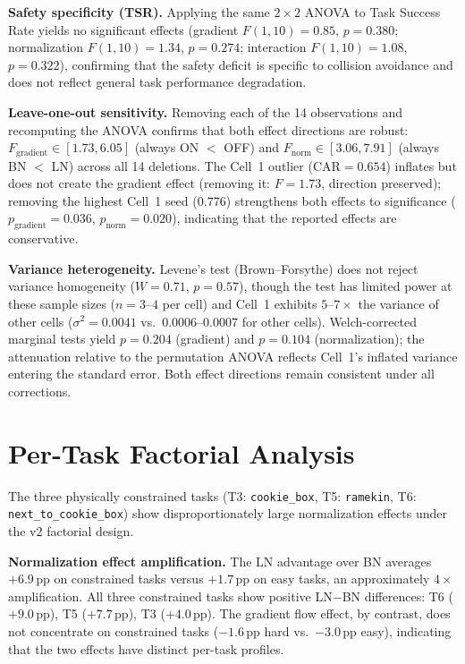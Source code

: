\textbf{Safety specificity (TSR).} Applying the same $2{\times}2$ ANOVA to Task Success Rate yields no significant effects (gradient $F(1,10){=}0.85$, $p{=}0.380$; normalization $F(1,10){=}1.34$, $p{=}0.274$; interaction $F(1,10){=}1.08$, $p{=}0.322$), confirming that the safety deficit is specific to collision avoidance and does not reflect general task performance degradation.

\textbf{Leave-one-out sensitivity.} Removing each of the 14 observations and recomputing the ANOVA confirms that both effect directions are robust: $F_\text{gradient} \in [1.73, 6.05]$ (always ON ${<}$ OFF) and $F_\text{norm} \in [3.06, 7.91]$ (always BN ${<}$ LN) across all 14 deletions. The Cell~1 outlier ($\text{CAR}{=}0.654$) inflates but does not create the gradient effect (removing it: $F{=}1.73$, direction preserved); removing the highest Cell~1 seed ($0.776$) strengthens both effects to significance ($p_\text{gradient}{=}0.036$, $p_\text{norm}{=}0.020$), indicating that the reported effects are conservative.

\textbf{Variance heterogeneity.} Levene's test (Brown--Forsythe) does not reject variance homogeneity ($W{=}0.71$, $p{=}0.57$), though the test has limited power at these sample sizes ($n{=}3$--$4$ per cell) and Cell~1 exhibits $5$--$7{\times}$ the variance of other cells ($\sigma^2{=}0.0041$ vs.\ $0.0006$--$0.0007$ for other cells). Welch-corrected marginal tests yield $p{=}0.204$ (gradient) and $p{=}0.104$ (normalization); the attenuation relative to the permutation ANOVA reflects Cell~1's inflated variance entering the standard error. Both effect directions remain consistent under all corrections.

\section{Per-Task Factorial Analysis}
\label{app:per_task_factorial}

The three physically constrained tasks (T3: \texttt{cookie\_box}, T5: \texttt{ramekin}, T6: \texttt{next\_to\_cookie\_box}) show disproportionately large normalization effects under the v2 factorial design.

\textbf{Normalization effect amplification.} The LN advantage over BN averages $+6.9$\,pp on constrained tasks versus $+1.7$\,pp on easy tasks, an approximately $4{\times}$ amplification. All three constrained tasks show positive LN$-$BN differences: T6 ($+9.0$\,pp), T5 ($+7.7$\,pp), T3 ($+4.0$\,pp). The gradient flow effect, by contrast, does not concentrate on constrained tasks ($-1.6$\,pp hard vs.\ $-3.0$\,pp easy), indicating that the two effects have distinct per-task profiles.

